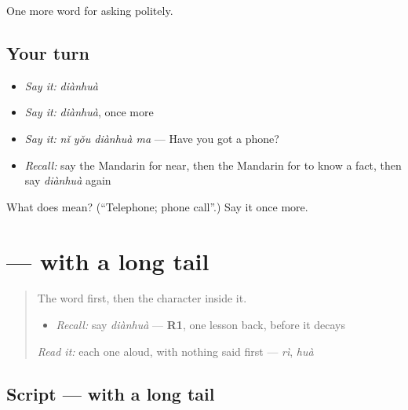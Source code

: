 \begin{grammarlens}[title={What you've built}]
One more word for asking politely.
\end{grammarlens}

\subsection*{Your turn}
\begin{itemize}
\raggedright
  \item \emph{Say it:} \emph{diànhuà}
  \item \emph{Say it:} \emph{diànhuà}, once more
  \item \emph{Say it:} \emph{nǐ yǒu diànhuà ma} — Have you got a phone?
  \item \emph{Recall:} say the Mandarin for near, then the Mandarin for to know a fact, then say \emph{diànhuà} again
\end{itemize}

\begin{tcolorbox}[breakable,colback=teal!4,colframe=teal!35!black,title={Before you move on}]
What does  mean? (\textquotedblleft{}Telephone; phone call\textquotedblright{}.) Say it once more.
\end{tcolorbox}
\section[\texorpdfstring{\zh{电} (diàn)}{电 (diàn)}]{ —  with a long tail}

\label{lesson:ZH-W63-dian-electric}



\begin{quote}
The word first, then the character inside it.

\begin{itemize}
\raggedright
  \item \emph{Recall:} say \emph{diànhuà} — \textbf{R1}, one lesson back, before it decays
\end{itemize}

\begin{quote}
 
\end{quote}

\emph{Read it:} each one aloud, with nothing said first — \emph{rì}, \emph{huà}
\end{quote}

\subsection*{Script —  with a long tail}

